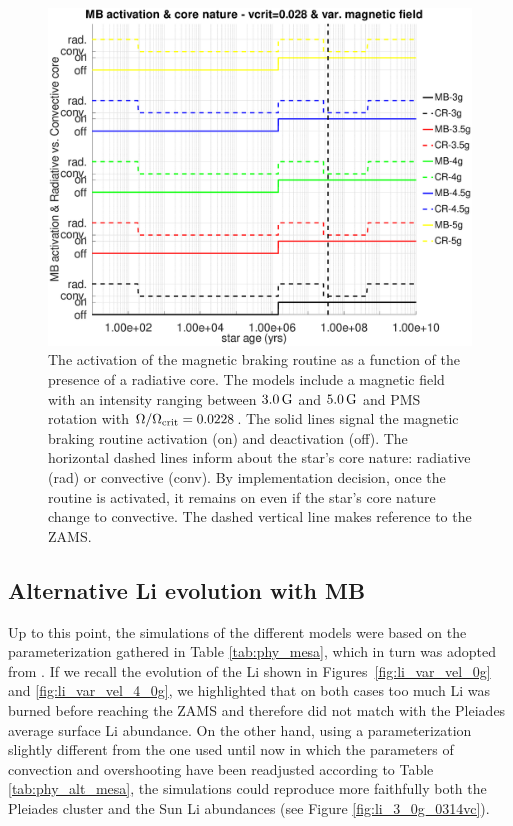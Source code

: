 \documentclass[fleqn,usenatbib]{mnras}
\begin{document}
\begin{figure}
	\includegraphics[trim = 15mm 10mm 15mm 10mm, clip,width=\columnwidth]{figures/mb_act_vc_028_var_g.eps}
    \caption{The activation of the magnetic braking routine as a function of the presence of a radiative core. The models include a magnetic field with an intensity ranging between $3.0\,\mathrm{G}$ and $5.0\,\mathrm{G}$ and PMS rotation with $\Omega / \Omega_{\mathrm{crit}}=0.0228$. The solid lines signal the magnetic braking routine activation (on) and deactivation (off). The horizontal dashed lines inform about the star's core nature: radiative (rad) or convective (conv). By implementation decision, once the routine is activated, it remains on even if the star's core nature change to convective. The dashed vertical line makes reference to the ZAMS.}
    \label{fig:mb_act_var_vel_vc_028}
\end{figure}

\subsection{Alternative Li evolution with MB}
Up to this point, the simulations of the different models were based on the parameterization gathered in Table \ref{tab:phy_mesa}, which in turn was adopted from \citet{Choi2016}. If we recall the evolution of the Li shown in Figures~\ref{fig:li_var_vel_0g} and \ref{fig:li_var_vel_4_0g}, we highlighted that on both cases too much Li was burned before reaching the ZAMS and therefore did not match with the Pleiades average surface Li abundance. On the other hand, using a parameterization slightly different from the one used until now in which the parameters of convection and overshooting have been readjusted according to Table \ref{tab:phy_alt_mesa}, the simulations could reproduce more faithfully both the Pleiades cluster and the Sun Li abundances (see Figure \ref{fig:li_3_0g_0314vc}).\par
\end{document}
